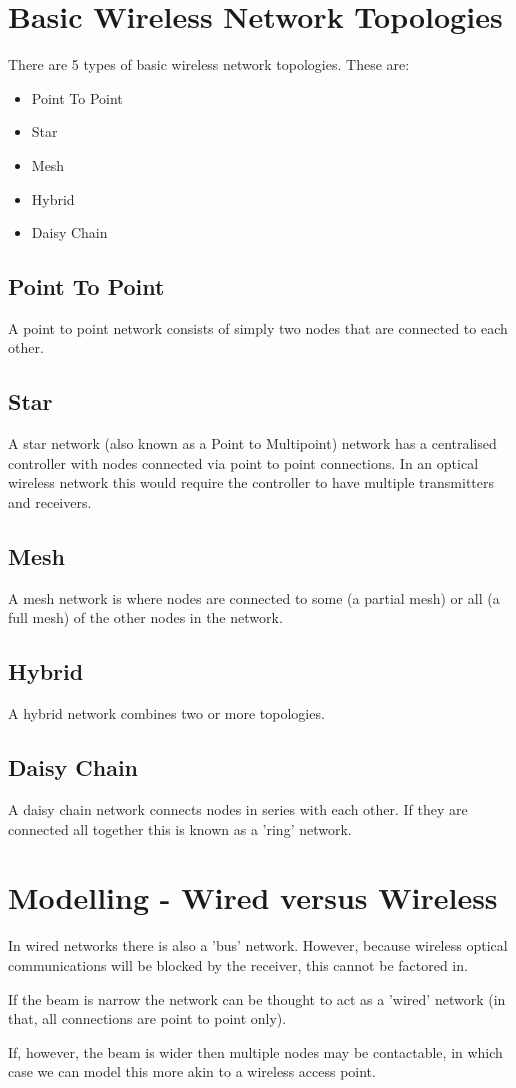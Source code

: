 \section{Basic Wireless Network Topologies}
There are 5 types of basic wireless network topologies. These are:

\begin{itemize}
\item{Point To Point}
\item{Star}
\item{Mesh}
\item{Hybrid}
\item{Daisy Chain}
\end{itemize}

\subsection{Point To Point}
A point to point network consists of simply two nodes that are connected to each
other.

\subsection{Star}
A star network (also known as a Point to Multipoint) network has a centralised
controller with nodes connected via point to point connections. In an optical
wireless network this would require the controller to have multiple transmitters
and receivers.

\subsection{Mesh}
A mesh network is where nodes are connected to some (a partial mesh) or all
(a full mesh) of the other nodes in the network.

\subsection{Hybrid}
A hybrid network combines two or more topologies.

\subsection{Daisy Chain}
A daisy chain network connects nodes in series with each other. If they are
connected all together this is known as a 'ring' network.

\section{Modelling - Wired versus Wireless}
In wired networks there is also a 'bus' network. However, because wireless
optical communications will be blocked by the receiver, this cannot be factored
in.

If the beam is narrow the network can be thought to act as a 'wired' network
(in that, all connections are point to point only).

If, however, the beam is wider then multiple nodes may be contactable, in which
case we can model this more akin to a wireless access point.